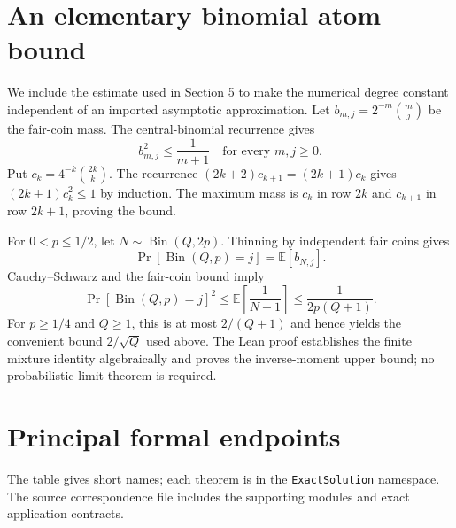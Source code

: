 \documentclass[11pt,letterpaper]{article}
\begin{document}
\appendix

\section{An elementary binomial atom
bound}\label{an-elementary-binomial-atom-bound}

We include the estimate used in Section 5 to make the numerical degree
constant independent of an imported asymptotic approximation. Let
\(b_{m,j}=2^{-m}\binom mj\) be the fair-coin mass. The central-binomial
recurrence gives \[b_{m,j}^2\le\frac1{m+1}
\quad\text{for every }m,j\ge0.\] Put \(c_k=4^{-k}\binom{2k}k\). The
recurrence \((2k+2)c_{k+1}=(2k+1)c_k\) gives \((2k+1)c_k^2\le1\) by
induction. The maximum mass is \(c_k\) in row \(2k\) and \(c_{k+1}\) in
row \(2k+1\), proving the bound.

For \(0<p\le1/2\), let \(N\sim\operatorname{Bin}(Q,2p)\). Thinning by
independent fair coins gives
\[\Pr[\operatorname{Bin}(Q,p)=j]=\mathbb E[b_{N,j}].\] Cauchy--Schwarz
and the fair-coin bound imply \[\Pr[\operatorname{Bin}(Q,p)=j]^2
 \le\mathbb E\!\left[\frac1{N+1}\right]
 \le\frac1{2p(Q+1)}.\] For \(p\ge1/4\) and \(Q\ge1\), this is at most
\(2/(Q+1)\) and hence yields the convenient bound \(2/\sqrt Q\) used
above. The Lean proof establishes the finite mixture identity
algebraically and proves the inverse-moment upper bound; no
probabilistic limit theorem is required.

\section{Principal formal endpoints}\label{principal-formal-endpoints}

The table gives short names; each theorem is in the
\texttt{ExactSolution} namespace. The source correspondence file
includes the supporting modules and exact application contracts.
\end{document}
